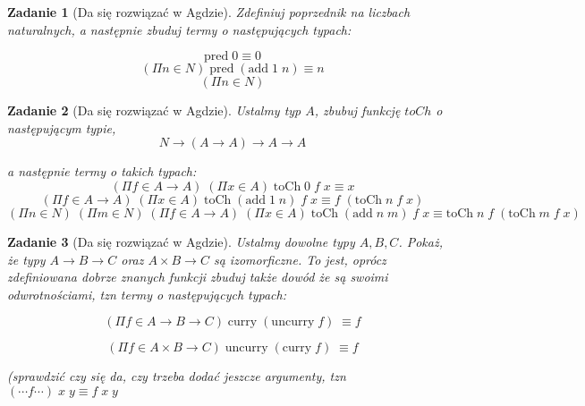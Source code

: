 \documentclass[10pt, a4paper]{article}
\newtheorem{zadanie}{Zadanie}
\begin{document}
\begin{zadanie}[Da się rozwiązać w Agdzie]
 Zdefiniuj poprzednik na liczbach naturalnych, a następnie zbuduj termy o następujących typach:

\[
  \mbox{pred}\;0 \equiv 0
\]
\[
  (\Pi n \in N)\;  \mbox{pred}\;(\mbox{add}\;1\;n) \equiv n
\]
\[
 (\Pi n \in N) 
\]

\end{zadanie}


\begin{zadanie}[Da się rozwiązać w Agdzie]
 Ustalmy typ $A$, zbubuj funkcję $toCh$ o następującym typie,
\[
  N \to (A \to A) \to A \to A
\]

a następnie termy o takich typach:
\[
 (\Pi f \in A \to A)\;(\Pi x \in A)\;\mbox{toCh}\;0\;f\;x \equiv x
\]
\[
 (\Pi f \in A \to A)\;(\Pi x \in A)\;\mbox{toCh}\;(\mbox{add}\;1\;n)\;f\;x \equiv f\;(\mbox{toCh}\;n\;f\;x)
\]
\[
 (\Pi n \in N)\;(\Pi m \in N)\;(\Pi f \in A \to A)\;(\Pi x \in A)\;
\mbox{toCh}\;(\mbox{add}\;n\;m)\;f\;x
\equiv
\mbox{toCh}\;n\;f\;(\mbox{toCh}\;m\;f\;x)
\]

\end{zadanie}


\begin{zadanie}[Da się rozwiązać w Agdzie]
 Ustalmy dowolne typy $A, B, C$.
 Pokaż, że typy $A \to B \to C$ oraz $A \times B \to C$ są izomorficzne. To jest, oprócz zdefiniowana dobrze
znanych funkcji zbuduj także dowód że są swoimi odwrotnościami, tzn termy o następujących typach:

\[
(\Pi f \in A \to B \to C)\; \mbox{curry}\; (\mbox{uncurry}\; f)\; \equiv f
\]

\[
(\Pi f \in A \times B \to C)\; \mbox{uncurry}\; (\mbox{curry}\; f)\; \equiv f
\]



(sprawdzić czy się da, czy trzeba dodać jeszcze argumenty, tzn $ (\cdots f \cdots )\;x\;y \equiv f \;x\;y$
\end{zadanie}
\end{document}
